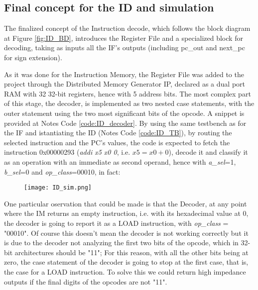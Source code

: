 \subsection{Final concept for the ID and simulation}
The finalized concept of the Instruction decode, which follows the block diagram at Figure \ref{fig:ID_BD}, introduces the Register File and a specialized block for decoding, taking as inputs all the IF's outputs (including {pc\_out} and {next\_pc} for sign extension).

As it was done for the Instruction Memory, the Register File was added to the project through the Distributed Memory Generator IP, declared as a dual port RAM with 32 32-bit registers, hence with 5 address bits. The most complex part of this stage, the decoder, is implemented as two nested case statements, with the outer statement using the two most significant bits of the opcode. A snippet is provided at Notes Code \ref{code:ID_decoder}.
By using the same testbench as for the IF and istantiating the ID (Notes Code \ref{code:ID_TB}), by routing the selected instruction and the PC's values, the code is expected to fetch the instruction 0x00000293 (\emph{addi x5 x0 0}, i.e. $x5 = x0 + 0$), decode it and classify it as an operation with an immediate as second operand, hence with \emph{a{\_}sel}=1, \emph{b{\_}sel}=0 and \emph{op{\_}class}=00010, in fact:

\begin{figure}[h!]
  \centering
  \texttt{[image: ID\_sim.png]}
\end{figure}

One particular oservation that could be made is that the Decoder, at any point where the IM returns an empty instruction, i.e. with its hexadecimal value at 0, the decoder is going to report it as a LOAD instruction, with \emph{op{\_}class} = "00010". Of course this doesn't mean the decoder is not working correctly but it is due to the decoder not analyzing the first two bits of the opcode, which in 32-bit architectures should be "11"; For this reason, with all the other bits being at zero, the case statement of the decoder is going to stop at the first case, that is, the case for a LOAD instruction. To solve this we could return high impedance outputs if the final digits of the opcodes are not "11".